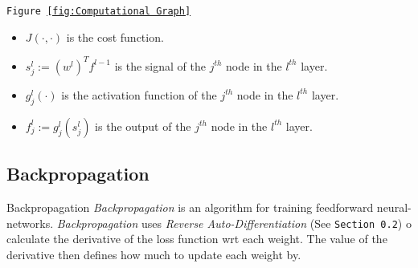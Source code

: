 \documentclass[11pt,a4paper]{article}
\begin{document}
  \begin{remark}{\texttt{Figure \ref{fig:Computational Graph}}}
    \begin{itemize}
      \item $J(\cdot,\cdot)$ is the cost function.
      \item $s_j^l:=(w^l)^Tf^{l-1}$ is the signal of the $j^{th}$ node in the $l^{th}$ layer.
      \item $g_j^l(\cdot)$ is the activation function of the $j^{th}$ node in the $l^{th}$ layer.
      \item $f_j^l:=g_j^l(s_j^l)$ is the output of the $j^{th}$ node in the $l^{th}$ layer.
    \end{itemize}
  \end{remark}

\subsection{Backpropagation}

  \begin{definition}{Backpropagation}
    \textit{Backpropagation} is an algorithm for training feedforward neural-networks. \textit{Backpropagation} uses \textit{Reverse Auto-Differentiation} (See \texttt{Section 0.2}) o calculate the derivative of the loss function wrt each weight. The value of the derivative then defines how much to update each weight by.
  \end{definition}
\end{document}

